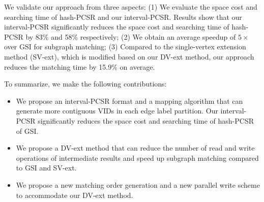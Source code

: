  We validate our approach from three aspects: (1) We evaluate the space cost and searching time of hash-PCSR and our interval-PCSR. Results show that our interval-PCSR significantly reduces the space cost and searching time of hash-PCSR by 83\% and 58\% respectively; (2) We obtain an average speedup of $5\times$ over GSI for subgraph matching; (3) Compared to the single-vertex extension method (SV-ext), which is modified based on our DV-ext method, our approach reduces the matching time by 15.9\% on average.

 To summarize, we make the following contributions:
 \begin{itemize}
  \item We propose an interval-PCSR format and a mapping algorithm that can generate more contiguous VIDs in each edge label partition. Our interval-PCSR significantly reduces the space cost and searching time of hash-PCSR of GSI.
  \item We propose a DV-ext method that can reduce the number of read and write operations of intermediate results and speed up subgraph matching compared to GSI and SV-ext.
  \item We propose a new matching order generation and a new parallel write scheme to accommodate our DV-ext method.
\end{itemize}
